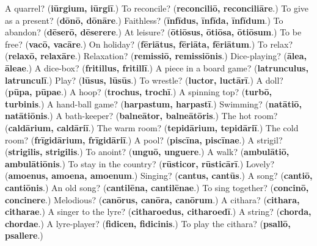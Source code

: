 \begin{tcolorbox}[breakable,colback=teal!4,colframe=teal!35!black,title={Before you move on}]
A quarrel? (\textbf{iūrgium, iūrgiī}.) To reconcile? (\textbf{reconciliō, reconciliāre}.) To give as a present? (\textbf{dōnō, dōnāre}.) Faithless? (\textbf{īnfīdus, īnfīda, īnfīdum}.) To abandon? (\textbf{dēserō, dēserere}.) At leisure? (\textbf{ōtiōsus, ōtiōsa, ōtiōsum}.) To be free? (\textbf{vacō, vacāre}.) On holiday? (\textbf{fēriātus, fēriāta, fēriātum}.) To relax? (\textbf{relaxō, relaxāre}.) Relaxation? (\textbf{remissiō, remissiōnis}.) Dice-playing? (\textbf{ālea, āleae}.) A dice-box? (\textbf{fritillus, fritillī}.) A piece in a board game? (\textbf{latrunculus, latrunculī}.) Play? (\textbf{lūsus, lūsūs}.) To wrestle? (\textbf{luctor, luctārī}.) A doll? (\textbf{pūpa, pūpae}.) A hoop? (\textbf{trochus, trochī}.) A spinning top? (\textbf{turbō, turbinis}.) A hand-ball game? (\textbf{harpastum, harpastī}.) Swimming? (\textbf{natātiō, natātiōnis}.) A bath-keeper? (\textbf{balneātor, balneātōris}.) The hot room? (\textbf{caldārium, caldāriī}.) The warm room? (\textbf{tepidārium, tepidāriī}.) The cold room? (\textbf{frīgidārium, frīgidāriī}.) A pool? (\textbf{piscīna, piscīnae}.) A strigil? (\textbf{strigilis, strigilis}.) To anoint? (\textbf{unguō, unguere}.) A walk? (\textbf{ambulātiō, ambulātiōnis}.) To stay in the country? (\textbf{rūsticor, rūsticārī}.) Lovely? (\textbf{amoenus, amoena, amoenum}.) Singing? (\textbf{cantus, cantūs}.) A song? (\textbf{cantiō, cantiōnis}.) An old song? (\textbf{cantilēna, cantilēnae}.) To sing together? (\textbf{concinō, concinere}.) Melodious? (\textbf{canōrus, canōra, canōrum}.) A cithara? (\textbf{cithara, citharae}.) A singer to the lyre? (\textbf{citharoedus, citharoedī}.) A string? (\textbf{chorda, chordae}.) A lyre-player? (\textbf{fidicen, fidicinis}.) To play the cithara? (\textbf{psallō, psallere}.)
\end{tcolorbox}
